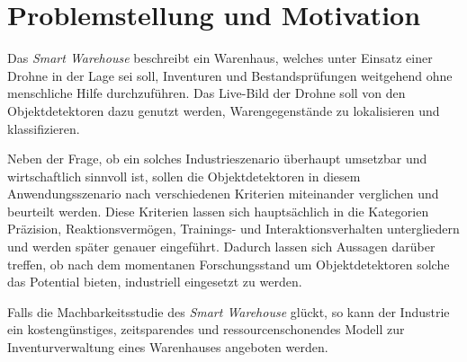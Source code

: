 \section{Problemstellung und Motivation}

Das \textit{Smart Warehouse} beschreibt ein Warenhaus, welches unter Einsatz einer Drohne in der Lage sei soll, Inventuren und Bestandsprüfungen weitgehend ohne menschliche Hilfe durchzuführen. Das Live-Bild der Drohne soll von den Objektdetektoren dazu genutzt werden, Warengegenstände zu lokalisieren und klassifizieren. 

Neben der Frage, ob ein solches Industrieszenario überhaupt umsetzbar und wirtschaftlich sinnvoll ist, sollen die Objektdetektoren in diesem Anwendungsszenario nach verschiedenen Kriterien miteinander verglichen und beurteilt werden. Diese Kriterien lassen sich hauptsächlich in die Kategorien Präzision, Reaktionsvermögen, Trainings- und Interaktionsverhalten untergliedern und werden später genauer eingeführt. Dadurch lassen sich Aussagen darüber treffen, ob nach dem momentanen Forschungsstand um Objektdetektoren solche das Potential bieten, industriell eingesetzt zu werden. 

Falls die Machbarkeitsstudie des \textit{Smart Warehouse} glückt, so kann der Industrie ein kostengünstiges, zeitsparendes und ressourcenschonendes Modell zur Inventurverwaltung eines Warenhauses angeboten werden.